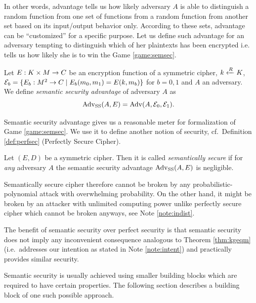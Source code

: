 In other words, advantage tells us how likely adversary $A$ is able to distinguish a random function from one set of functions from a random function from another set based on its input/output behavior only. According to these sets, advantage can be ``customized'' for a specific purpose. Let us define such advantage for an adversary tempting to distinguish which of her plaintexts has been encrypted i.e. tells us how likely she is to win the Game \ref{game:semsec}.

\begin{defn}
\label{def:ssadvant}
	Let $E: K\times M\rightarrow C$ be an encryption function of a symmetric cipher, $k\xleftarrow{R} K$, ${\cal E}_b = \{E_b:M^2\rightarrow C \mid E_b(m_0,m_1) = E(k,m_b)\}$ for $b=0,1$ and $A$ an adversary. We define {\em semantic security advantage} of adversary $A$ as
	\[
		\operatorname*{Adv_{SS}}(A,E) = \operatorname*{Adv}(A,{\cal E}_0,{\cal E}_1) .
	\]
\end{defn}

Semantic security advantage gives us a reasonable meter for formalization of Game \ref{game:semsec}. We use it to define another notion of security, cf.\ Definition \ref{def:perfsec} (Perfectly Secure Cipher).

\begin{defn}
\label{def:semsec}
	Let $(E,D)$ be a symmetric cipher. Then it is called {\em semantically secure} if for {\em any} adversary $A$ the semantic security advantage $\operatorname*{Adv_{SS}}(A,E)$ is negligible.
\end{defn}


Semantically secure cipher therefore cannot be broken by any probabilistic-polynomial attack with overwhelming probability. On the other hand, it might be broken by an attacker with unlimited computing power unlike perfectly secure cipher which cannot be broken anyways, see Note \ref{note:indist}.

The benefit of semantic security over perfect security is that semantic security does not imply any inconvenient consequence analogous to Theorem \ref{thm:kgeqm} (i.e.\ addresses our intention as stated in Note \ref{note:intent}) and practically provides similar security.

Semantic security is usually achieved using smaller building blocks which are required to have certain properties. The following section describes a building block of one such possible approach.

